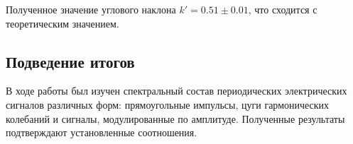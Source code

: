 \documentclass[12pt,a4paper]{article}
\begin{document}
Полученное значение углового наклона $k' = 0.51 \pm 0.01$, что сходится с теоретическим значением. 
\subsection*{Подведение итогов}
В ходе работы был изучен спектральный состав периодических электрических сигналов различных форм: прямоугольные импульсы, цуги гармонических колебаний и сигналы, модулированные по амплитуде. 
Полученные результаты подтверждают установленные соотношения.
\end{document}
